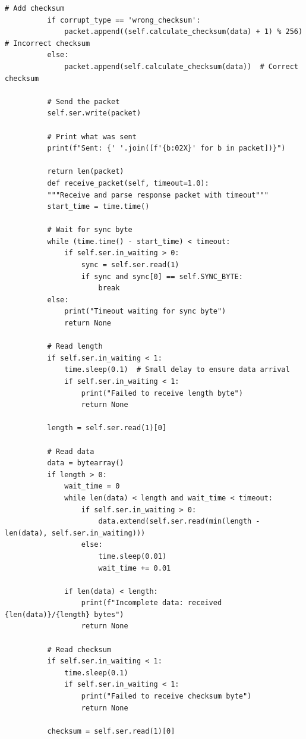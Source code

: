 \documentclass{article}
\begin{document}
\begin{lstlisting}[caption={client}, label={lst:example}]
          # Add checksum
          if corrupt_type == 'wrong_checksum':
              packet.append((self.calculate_checksum(data) + 1) % 256)  # Incorrect checksum
          else:
              packet.append(self.calculate_checksum(data))  # Correct checksum
              
          # Send the packet
          self.ser.write(packet)
          
          # Print what was sent
          print(f"Sent: {' '.join([f'{b:02X}' for b in packet])}")
          
          return len(packet)
          def receive_packet(self, timeout=1.0):
          """Receive and parse response packet with timeout"""
          start_time = time.time()
          
          # Wait for sync byte
          while (time.time() - start_time) < timeout:
              if self.ser.in_waiting > 0:
                  sync = self.ser.read(1)
                  if sync and sync[0] == self.SYNC_BYTE:
                      break
          else:
              print("Timeout waiting for sync byte")
              return None
              
          # Read length
          if self.ser.in_waiting < 1:
              time.sleep(0.1)  # Small delay to ensure data arrival
              if self.ser.in_waiting < 1:
                  print("Failed to receive length byte")
                  return None
                  
          length = self.ser.read(1)[0]
          
          # Read data
          data = bytearray()
          if length > 0:
              wait_time = 0
              while len(data) < length and wait_time < timeout:
                  if self.ser.in_waiting > 0:
                      data.extend(self.ser.read(min(length - len(data), self.ser.in_waiting)))
                  else:
                      time.sleep(0.01)
                      wait_time += 0.01
                      
              if len(data) < length:
                  print(f"Incomplete data: received {len(data)}/{length} bytes")
                  return None
                  
          # Read checksum
          if self.ser.in_waiting < 1:
              time.sleep(0.1)
              if self.ser.in_waiting < 1:
                  print("Failed to receive checksum byte")
                  return None
                  
          checksum = self.ser.read(1)[0]
          

\end{lstlisting}
\end{document}
